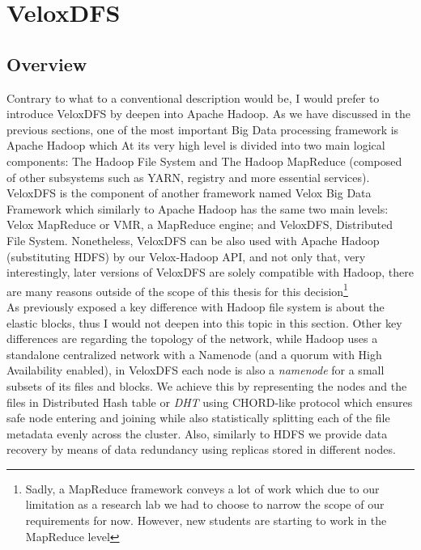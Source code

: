 \section{VeloxDFS}
\subsection{Overview}
Contrary to what to a conventional description would be, I would prefer to introduce
VeloxDFS by deepen into Apache Hadoop.  As we have discussed in the previous sections, 
one of the most important Big Data processing framework is Apache Hadoop which 
At its very high level is divided into two main logical components: 
The Hadoop File System and The Hadoop MapReduce (composed of other subsystems such as YARN, registry
and more essential services).  \\

VeloxDFS is the component of another framework named Velox Big Data Framework
which similarly to Apache Hadoop has the same two main levels: Velox MapReduce or VMR,
a MapReduce engine; and VeloxDFS, Distributed File System.  Nonetheless,
VeloxDFS can be also used with Apache Hadoop (substituting HDFS) by our Velox-Hadoop API, 
and not only that, very interestingly, later versions of VeloxDFS are solely compatible with
Hadoop, there are many reasons outside of the scope of this thesis for this decision\footnote{Sadly, a MapReduce framework conveys a lot of work which due to our limitation as a research lab we had to choose
to narrow the scope of our requirements for now. However, new students are starting to work in the MapReduce level}  \\

As previously exposed a key difference with Hadoop file system is
about the elastic blocks, thus I would not deepen into this topic in this
section. Other key differences are regarding the topology of the network, while
Hadoop uses a standalone centralized network with a Namenode (and a quorum with
High Availability enabled), in  VeloxDFS each node is also a \textit{namenode} for a small subsets of
its files and blocks. We achieve this by representing the nodes and the files
in Distributed Hash table or \textit{DHT} using CHORD-like protocol \cite{stoica2001chord} which ensures
safe node entering and joining while also statistically splitting each of the
file metadata evenly across the cluster. Also, similarly to HDFS we provide 
data recovery by means of data redundancy using replicas stored in different nodes.  \\ 

